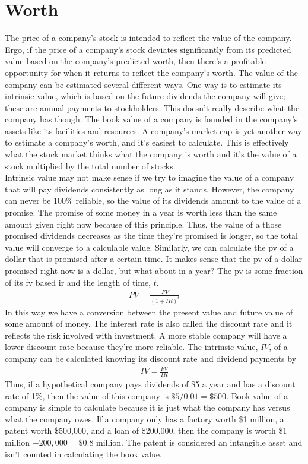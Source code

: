 \section{Worth}
The price of a company's stock is intended to reflect the value of the company. Ergo, if the price of a company's stock deviates significantly from its predicted value based on the company's predicted worth, then there's a profitable opportunity for when it returns to reflect the company's worth. The value of the company can be estimated several different ways. One way is to estimate its intrinsic value, which is based on the future dividends the company will give; these are annual payments to stockholders. This doesn't really describe what the company has though. The book value of a company is founded in the company's assets like its facilities and resources. A company's market cap is yet another way to estimate a company's worth, and it's easiest to calculate. This is effectively what the stock market thinks what the company is worth and it's the value of a stock multiplied by the total number of stocks. \\
\newpage
Intrinsic value may not make sense if we try to imagine the value of a company that will pay dividends consistently as long as it stands. However, the company can never be 100\% reliable, so the value of its dividends amount to the value of a promise. The promise of some money in a year is worth less than the same amount given right now because of this principle. Thus, the value of a those promised dividends decreases as the time they're promised is longer, so the total value will converge to a calculable value. Similarly, we can calculate the \ac{pv} of a dollar that is promised after a certain time. It makes sense that the \ac{pv} of a dollar promised right now is a dollar, but what about in a year? The \ac{pv} is some fraction of its \ac{fv} based \ac{ir} and the length of time, $t$.
\begin{align*}
PV=\frac{FV}{(1+IR)^t}
\end{align*}
In this way we have a conversion between the present value and future value of some amount of money. The interest rate is also called the discount rate and it reflects the risk involved with investment. A more stable company will have a lower discount rate because they're more reliable. The intrinsic value, $IV$, of a company can be calculated knowing its discount rate and dividend payments by
\begin{align*}
IV=\frac{FV}{IR}
\end{align*}
Thus, if a hypothetical company pays dividends of \$5 a year and has a discount rate of 1\%, then the value of this company is $\$5/0.01=\$500$. Book value of a company is simple to calculate because it is just what the company has versus what the company owes. If a company only has a factory worth \$1 million, a patent worth \$500,000, and a loan of \$200,000, then the company is worth \$1 million $-200,000=\$0.8$ million. The patent is considered an intangible asset and isn't counted in calculating the book value. \\

